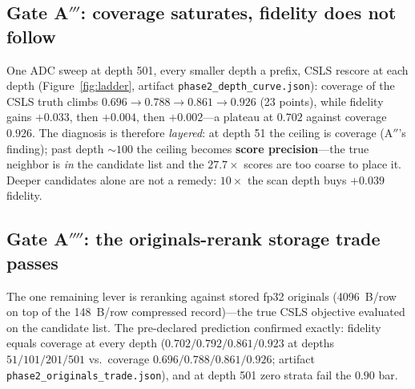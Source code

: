 \documentclass[sigconf, nonacm]{acmart}
\begin{document}
\subsection{Gate A$'''$: coverage saturates, fidelity does not follow}

One ADC sweep at depth 501, every smaller depth a prefix, CSLS rescore at
each depth (Figure~\ref{fig:ladder}, artifact
\texttt{phase2\_depth\_curve.json}): coverage of the CSLS truth climbs
$0.696 \to 0.788 \to 0.861 \to 0.926$ (23 points), while fidelity gains
$+0.033$, then $+0.004$, then $+0.002$---a plateau at $0.702$ against
coverage $0.926$. The diagnosis is therefore \emph{layered}: at depth 51
the ceiling is coverage (A$''$'s finding); past depth ${\sim}100$ the
ceiling becomes \textbf{score precision}---the true neighbor is \emph{in}
the candidate list and the $27.7\times$ scores are too coarse to place it.
Deeper candidates alone are not a remedy: $10\times$ the scan depth buys
$+0.039$ fidelity.

\subsection{Gate A$''''$: the originals-rerank storage trade passes}

The one remaining lever is reranking against stored fp32 originals
(4096~B/row on top of the 148~B/row compressed record)---the true CSLS
objective evaluated on the candidate list. The pre-declared prediction
confirmed exactly: fidelity equals coverage at every depth
($0.702/0.792/0.861/\mathbf{0.923}$ at depths $51/101/201/501$ vs.\
coverage $0.696/0.788/0.861/0.926$; artifact
\texttt{phase2\_originals\_trade.json}), and at depth 501 zero strata
fail the $0.90$ bar.
\end{document}
